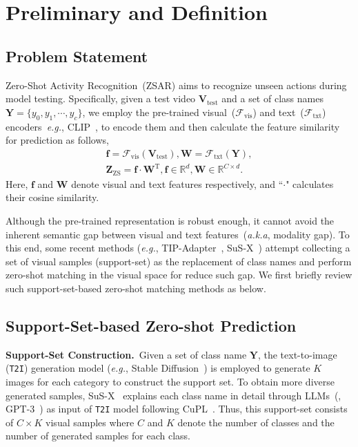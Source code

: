\section{Preliminary and Definition}
\label{sec:method}

\subsection{Problem Statement}
Zero-Shot Activity Recognition~(ZSAR) aims to recognize unseen actions during model testing. Specifically, given a test video $\bm{V}_\mathrm{test}$ and a set of class names $\bm{Y}=\{y_{0},y_{1},\cdots,y_{c}\}$, we employ the pre-trained visual~($\mathcal{F}_\mathrm{vis}$) and text~($\mathcal{F}_\mathrm{txt}$) encoders~\emph{e.g.}, CLIP~\cite{radford2021learning}, to encode them and then calculate the feature similarity for prediction as follows,
\begin{equation}
\begin{gathered}
\bm{f} = \mathcal{F}_\mathrm{vis}(\bm{V}_\mathrm{test}), \bm{W} = \mathcal{F}_\mathrm{txt}(\bm{Y}),\\
\bm{Z}_{\mathrm{ZS}} = \bm{f} \cdot \bm{W}^\mathrm{T}, \bm{f} \in \mathbb{R}^{d}, \bm{W} \in \mathbb{R}^{C \times d}.
\end{gathered}
\end{equation}
Here, $\bm{f}$ and $\bm{W}$ denote visual and text features respectively, and ``$\cdot$" calculates their cosine similarity.

Although the pre-trained representation is robust enough, it cannot avoid the inherent semantic gap between visual and text features~(\emph{a.k.a}, modality gap). To this end, some recent methods (\emph{e.g.}, TIP-Adapter~\cite{zhang2021tipadaptertrainingfreeclipadapterbetter}, SuS-X~\cite{udandarao2022sus-x}) attempt collecting a set of visual samples (support-set) as the replacement of class names and perform zero-shot matching in the visual space for reduce such gap. We first briefly review such support-set-based zero-shot matching methods as below.

\subsection{Support-Set-based Zero-shot Prediction}
\noindent\textbf{Support-Set Construction.}~Given a set of class name $\bm{Y}$, the text-to-image (\texttt{T2I}) generation model (\emph{e.g.}, Stable Diffusion~\cite{rombach2022high}) is employed to generate $K$ images for each category to construct the support set. To obtain more diverse generated samples, SuS-X~\cite{udandarao2022sus-x} explains each class name in detail through LLMs~(\eg, GPT-3~\cite{brown2020languagemodelsfewshotlearners}) as input of \texttt{T2I} model following CuPL~\cite{pratt2023does}. Thus, this support-set consists of $C \times K$ visual samples where $C$ and $K$ denote the number of classes and the number of generated samples for each class.

